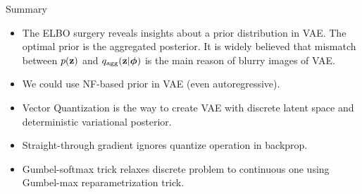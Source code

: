 \begin{frame}{Summary}
	\begin{itemize}
		\item The ELBO surgery reveals insights about a prior distribution in VAE. The optimal prior is the aggregated posterior. It is widely believed that mismatch between $p(\mathbf{z})$ and $q_{\text{agg}}(\mathbf{z} | \boldsymbol{\phi})$ is the main reason of blurry images of VAE.
		\vfill
		\item We could use NF-based prior in VAE (even autoregressive).
		\vfill	
		\item Vector Quantization is the way to create VAE with discrete latent space and deterministic variational posterior. 
		\vfill
		\item Straight-through gradient ignores quantize operation in backprop.			
		\vfill
		\item Gumbel-softmax trick relaxes discrete problem to continuous one using Gumbel-max reparametrization trick.
	\end{itemize}
\end{frame}

 
